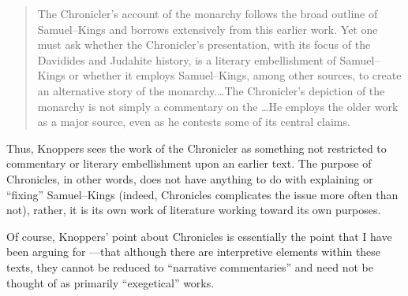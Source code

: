 \begin{quote}
    The Chronicler's account of the monarchy follows the broad outline of Samuel--Kings and borrows extensively from this earlier work. Yet one must ask whether the Chronicler's presentation, with its focus of the Davidides and Judahite history, is a literary embellishment of Samuel--Kings or whether it employs Samuel--Kings, among other sources, to create an alternative story of the monarchy.\dots The Chronicler's depiction of the monarchy is not simply a commentary on the \DtrH\dots He employs the older work as a major source, even as he contests some of its central claims.\autocite[132--33]{knoppers2003}
\end{quote}
\noindent
Thus, Knoppers sees the work of the Chronicler as something not restricted to commentary or literary embellishment upon an earlier text. The purpose of Chronicles, in other words, does not have anything to do with explaining or ``fixing'' Samuel--Kings (indeed, Chronicles complicates the issue more often than not), rather, it is its own work of literature working toward its own purposes.

Of course, Knoppers' point about Chronicles is essentially the point that I have been arguing for \visavis \rwb---that although there are interpretive elements within these texts, they cannot be reduced to ``narrative commentaries'' and need not be thought of as primarily ``exegetical'' works.